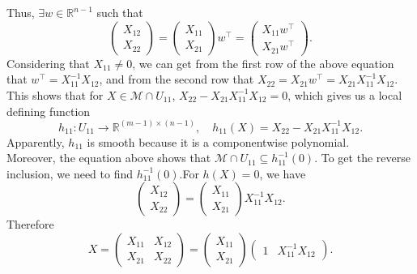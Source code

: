 \documentclass[en, oneside]{assignment}
\begin{document}
\begin{sol}
\begin{itemize}
        Thus, $\exists w \in \mathbb{R}^{n-1}$ such that
        \begin{equation*}
            \begin{pmatrix}X_{12}\\X_{22}\end{pmatrix} = \begin{pmatrix}X_{11}\\X_{21}\end{pmatrix} w^\top 
            = \begin{pmatrix}X_{11}w^\top\\X_{21}w^\top\end{pmatrix}.
        \end{equation*}
        Considering that $X_{11} \neq 0$, we can get from the first row of the above equation that $w^\top = X_{11}^{-1}X_{12}$, 
        and from the second row that $X_{22} = X_{21}w^\top = X_{21}X_{11}^{-1}X_{12}$.\\
        This shows that for $X \in \mathcal{M} \cap U_{11}$, $X_{22} - X_{21}X_{11}^{-1}X_{12} = 0$, which gives us a local defining function
        \begin{equation*}
            h_{11}: U_{11} \to \mathbb{R}^{(m-1) \times (n-1)}, \quad h_{11}(X) = X_{22} - X_{21}X_{11}^{-1}X_{12}.
        \end{equation*}
        Apparently, $h_{11}$ is smooth because it is a componentwise polynomial.\\
        Moreover, the equation above shows that $\mathcal{M} \cap U_{11} \subseteq h_{11}^{-1}\left(0\right)$.
        To get the reverse inclusion, we need to find $h_{11}^{-1}\left(0\right)$.For $h(X) = 0$, we have
        \begin{equation*}
            \begin{pmatrix}X_{12}\\X_{22}\end{pmatrix} = \begin{pmatrix}X_{11}\\X_{21}\end{pmatrix}X_{11}^{-1}X_{12}.
        \end{equation*}
        Therefore
        \begin{equation*}
            X = \begin{pmatrix}
                X_{11} & X_{12}\\
                X_{21} & X_{22}
            \end{pmatrix} = \begin{pmatrix}X_{11}\\X_{21}\end{pmatrix}\begin{pmatrix}1&X_{11}^{-1}X_{12}\end{pmatrix}.

\end{equation*}
\end{itemize}
\end{sol}
\end{document}
